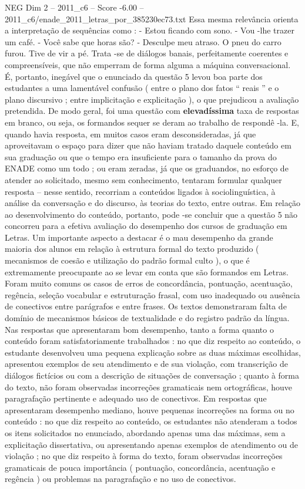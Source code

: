 \begin{textsample}{NEG Dim 2 – 2011\_c6 – Score -6.00 – 2011\_c6/enade\_2011\_letras\_por\_385230ec73.txt}
Essa mesma relevância orienta a interpretação de sequências como : - Estou ficando com sono. - Vou -lhe trazer um café. - Você sabe que horas são? - Desculpe meu atraso.
O pneu do carro furou.
Tive de vir a pé.
Trata -se de diálogos banais, perfeitamente coerentes e compreensíveis, que não emperram de forma alguma a máquina conversacional.
É, portanto, inegável que o enunciado da questão 5 levou boa parte dos estudantes a uma lamentável confusão ( entre o plano dos fatos “ reais ” e o plano discursivo ; entre implicitação e explicitação ), o que prejudicou a avaliação pretendida.
De modo geral, foi uma questão com \textbf{elevadíssima} taxa de respostas em branco, ou seja, os formandos sequer se deram ao trabalho de respondê -la.
E, quando havia resposta, em muitos casos eram desconsideradas, já que aproveitavam o espaço para dizer que não haviam tratado daquele conteúdo em sua graduação ou que o tempo era insuficiente para o tamanho da prova do ENADE como um todo ; ou eram zeradas, já que os graduandos, no esforço de atender ao solicitado, mesmo sem conhecimento, tentaram formular qualquer resposta – nesse sentido, recorriam a conteúdos ligados à sociolinguística, à análise da conversação e do discurso, às teorias do texto, entre outras.
Em relação ao desenvolvimento do conteúdo, portanto, pode -se concluir que a questão 5 não concorreu para a efetiva avaliação do desempenho dos cursos de graduação em Letras.
Um importante aspecto a destacar é o mau desempenho da grande maioria dos alunos em relação à estrutura formal do texto produzido ( mecanismos de coesão e utilização do padrão formal culto ), o que é extremamente preocupante ao se levar em conta que são formandos em Letras.
Foram muito comuns os casos de erros de concordância, pontuação, acentuação, regência, seleção vocabular e estruturação frasal, com uso inadequado ou ausência de conectivos entre parágrafos e entre frases.
Os textos demonstraram falta de domínio de mecanismos básicos de textualidade e do registro padrão da língua.
Nas respostas que apresentaram bom desempenho, tanto a forma quanto o conteúdo foram satisfatoriamente trabalhados : no que diz respeito ao conteúdo, o estudante desenvolveu uma pequena explicação sobre as duas máximas escolhidas, apresentou exemplos de seu atendimento e de sua violação, com transcrição de diálogos fictícios ou com a descrição de situações de conversação ; quanto à forma do texto, não foram observadas incorreções gramaticais nem ortográficas, houve paragrafação pertinente e adequado uso de conectivos.
Em respostas que apresentaram desempenho mediano, houve pequenas incorreções na forma ou no conteúdo : no que diz respeito ao conteúdo, os estudantes não atenderam a todos os itens solicitados no enunciado, abordando apenas uma das máximas, sem a explicitação dissertativa, ou apresentando apenas exemplos de atendimento ou de violação ; no que diz respeito à forma do texto, foram observadas incorreções gramaticais de pouca importância ( pontuação, concordância, acentuação e regência ) ou problemas na paragrafação e no uso de conectivos.

\end{textsample}

